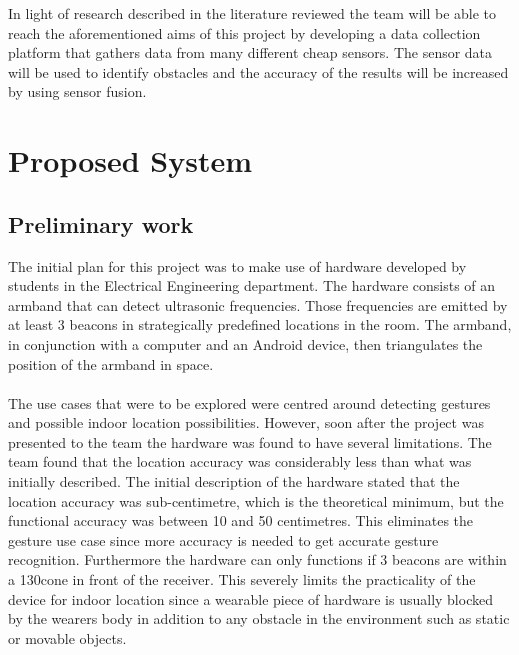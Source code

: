 \documentclass[prodmode,acmtosem]{acmsmall} %
\begin{document}
In light of research described in the literature reviewed the team will be able to reach the aforementioned aims of this project by developing a data collection platform that gathers data from many different cheap sensors. The sensor data will be used to identify obstacles and the accuracy of the results will be increased by using sensor fusion.



\section{Proposed System}
\subsection{Preliminary work}
\label{sec:Prelim}



The initial plan for this project was to make use of hardware developed by students in the Electrical Engineering department. The hardware consists of an armband that can detect ultrasonic frequencies. Those frequencies are emitted by at least 3 beacons in strategically predefined locations in the room. The armband, in conjunction with a computer and an Android device, then triangulates the position of the armband in space.\\\\
The use cases that were to be explored were centred around detecting gestures and possible indoor location possibilities. However, soon after the project was presented to the team the hardware was found to have several limitations. The team found that the location accuracy was considerably less than what was initially described. The initial description of the hardware stated that the location accuracy was sub-centimetre, which is the theoretical minimum, but the functional accuracy was between 10 and 50 centimetres. This eliminates the gesture use case since more accuracy is needed to get accurate gesture recognition.
Furthermore the hardware can only functions if 3 beacons are within a 130\degree cone in front of the receiver. This severely limits the practicality of the device for indoor location since a wearable piece of hardware is usually blocked by the wearers body in addition to any obstacle in the environment such as static or movable objects.\\\\
\end{document}
